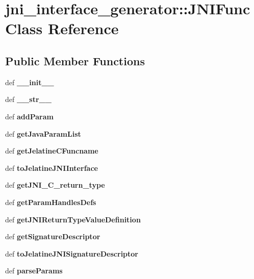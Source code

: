 \section{jni\_\-interface\_\-generator::JNIFunc Class Reference}
\label{classjni__interface__generator_1_1_j_n_i_func}
\subsection*{Public Member Functions}
\begin{DoxyCompactItemize}
\item 
def {\bfseries \_\-\_\-init\_\-\_\-}\label{classjni__interface__generator_1_1_j_n_i_func_a56eb4bbd0fb3405d001d784caebfce2a}

\item 
def {\bfseries \_\-\_\-str\_\-\_\-}\label{classjni__interface__generator_1_1_j_n_i_func_ab5332944a784df282e89ff5f196b6045}

\item 
def {\bfseries addParam}\label{classjni__interface__generator_1_1_j_n_i_func_ac4345fb8567da047d4965f20277a55a1}

\item 
def {\bfseries getJavaParamList}\label{classjni__interface__generator_1_1_j_n_i_func_af08e3f259aad949ee4a3042bfe90f2ac}

\item 
def {\bfseries getJelatineCFuncname}\label{classjni__interface__generator_1_1_j_n_i_func_a4d81912caaa5b3aa4a41d76b74e23efc}

\item 
def {\bfseries toJelatineJNIInterface}\label{classjni__interface__generator_1_1_j_n_i_func_a8272fe6b617ec702184d49bf86e18c72}

\item 
def {\bfseries getJNI\_\-C\_\-return\_\-type}\label{classjni__interface__generator_1_1_j_n_i_func_a6b4c2b09b2e20dc113ac4e6f6156f387}

\item 
def {\bfseries getParamHandlesDefs}\label{classjni__interface__generator_1_1_j_n_i_func_a68a6d7cb5d99e93fee9bfc0650699872}

\item 
def {\bfseries getJNIReturnTypeValueDefinition}\label{classjni__interface__generator_1_1_j_n_i_func_aafe019ca2e1367313030b6326c31f7d4}

\item 
def {\bfseries getSignatureDescriptor}\label{classjni__interface__generator_1_1_j_n_i_func_a0ee099566449a8e221b43b1404f0edfa}

\item 
def {\bfseries toJelatineJNISignatureDescriptor}\label{classjni__interface__generator_1_1_j_n_i_func_a97b8016357e49d3d8466d9cc0f024869}

\item 
def {\bfseries parseParams}\label{classjni__interface__generator_1_1_j_n_i_func_ab18269d5f3d90470f478d4ca1c235a2b}

\end{DoxyCompactItemize}
